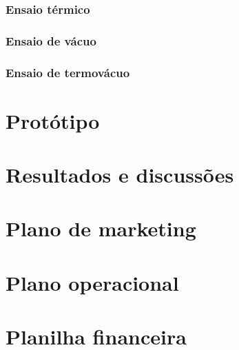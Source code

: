 \documentclass[
	12pt,				%
	openright,			%
	oneside,			%
	a4paper,			%
	english,			%
	french,				%
	spanish,			%
	brazil,				%
	oldfontcommands
	]{abntex2}
\begin{document}
	
\subsection[Ensaio térmico]{Ensaio térmico}

\subsection[Ensaio de vácuo]{Ensaio de vácuo}	

\subsection[Ensaio de termovácuo]{Ensaio de termovácuo}		
	
	
	
	
\chapter[Protótipo]{Protótipo}

\chapter[Resultados e discussões]{Resultados e discussões}

\chapter[Plano de marketing]{Plano de marketing}

\chapter[Plano operacional]{Plano operacional}

\chapter[Planilha financeira]{Planilha financeira}
\end{document}
